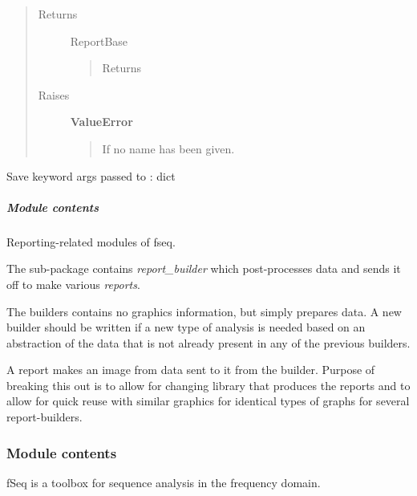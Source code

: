 \documentclass[letterpaper,10pt,english]{sphinxmanual}
\begin{document}
\begin{fulllineitems}
\begin{fulllineitems}
\begin{quote}
\begin{description}
\item[{Returns}] \leavevmode
ReportBase
\begin{quote}

Returns 
\end{quote}

\item[{Raises}] \leavevmode
\textbf{ValueError}
\begin{quote}

If no name has been given.
\end{quote}

\end{description}\end{quote}

\end{fulllineitems}


\begin{fulllineitems}
\label{fseq.reporting:fseq.reporting.reports.ReportBase.saveKwargs}
Save keyword args passed to :
dict

\end{fulllineitems}


\end{fulllineitems}



\subparagraph{Module contents}
\label{fseq.reporting:module-fseq.reporting}\label{fseq.reporting:module-contents}
Reporting-related modules of fseq.

The sub-package contains \emph{report\_builder} which post-processes data and
sends it off to make various \emph{reports}.

The builders contains no graphics information, but simply prepares data.
A new builder should be written if a new type of analysis is needed based
on an abstraction of the data that is not already present in any of the
previous builders.

A report makes an image from data sent to it from the builder.
Purpose of breaking this out is to allow for changing library that produces
the reports and to allow for quick reuse with similar graphics for identical
types of graphs for several report-builders.


\subsubsection{Module contents}
\label{fseq:module-contents}\label{fseq:module-fseq}
fSeq is a toolbox for sequence analysis in the frequency domain.
\end{document}

